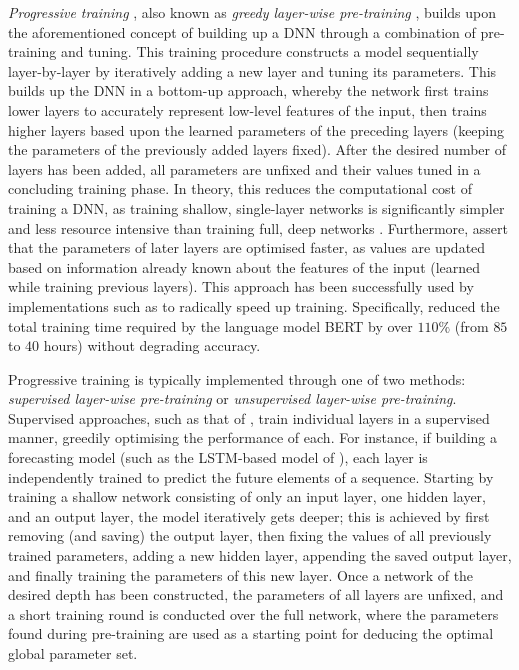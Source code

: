 \documentclass[a4paper, 11pt]{report}
\begin{document}
    \emph{Progressive training} \citep{xu-2021}, also known as \emph{greedy layer-wise pre-training} \citep{xu-2018}, builds upon the aforementioned concept of building up a DNN through a combination of pre-training and tuning. This training procedure constructs a model sequentially layer-by-layer by iteratively adding a new layer and tuning its parameters. This builds up the DNN in a bottom-up approach, whereby the network first trains lower layers to accurately represent low-level features of the input, then trains higher layers based upon the learned parameters of the preceding layers (keeping the parameters of the previously added layers fixed). After the desired number of layers has been added, all parameters are unfixed and their values tuned in a concluding training phase. In theory, this reduces the computational cost of training a DNN, as training shallow, single-layer networks is significantly simpler and less resource intensive than training full, deep networks \citep{xu-2021}. Furthermore, \citet{xu-2021} assert that the parameters of later layers are optimised faster, as values are updated based on information already known about the features of the input (learned while training previous layers). This approach has been successfully used by implementations such as \citet{yang-2020} to radically speed up training. Specifically, \citet{yang-2020} reduced the total training time required by the language model BERT by over $110\%$ (from $85$ to $40$ hours) without degrading accuracy.

    Progressive training is typically implemented through one of two methods: \emph{supervised layer-wise pre-training} or \emph{unsupervised layer-wise pre-training}. Supervised approaches, such as that of \citet{ienco-2019}, train individual layers in a supervised manner, greedily optimising the performance of each. For instance, if building a forecasting model (such as the LSTM-based model of \citet{xu-2018}), each layer is independently trained to predict the future elements of a sequence. Starting by training a shallow network consisting of only an input layer, one hidden layer, and an output layer, the model iteratively gets deeper; this is achieved by first removing (and saving) the output layer, then fixing the values of all previously trained parameters, adding a new hidden layer, appending the saved output layer, and finally training the parameters of this new layer. Once a network of the desired depth has been constructed, the parameters of all layers are unfixed, and a short training round is conducted over the full network, where the parameters found during pre-training are used as a starting point for deducing the optimal global parameter set. 
\end{document}
